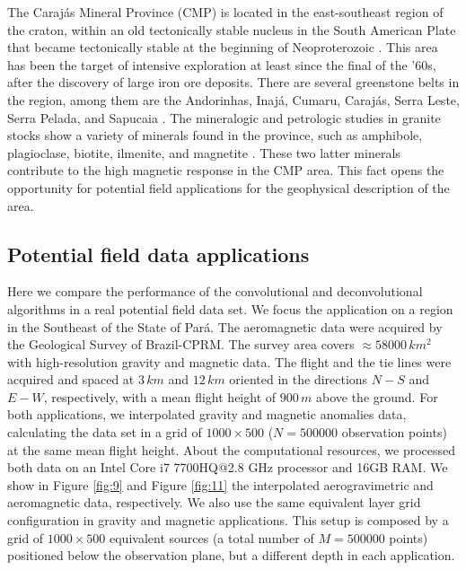 The Carajás Mineral Province (CMP) is located in the east-southeast region of the craton, within an old tectonically stable nucleus in the South American Plate that became tectonically stable at the beginning of Neoproterozoic \citep{salomao_etal_2019}. This area has been the target of intensive exploration at least since the final of the '60s, after the discovery of large iron ore deposits. There are several greenstone belts in the region, among them are the Andorinhas, Inajá, Cumaru, Carajás, Serra Leste, Serra Pelada, and Sapucaia \citep{santos_etal_2000}. The mineralogic and petrologic studies in granite stocks show a variety of minerals found in the province, such as amphibole, plagioclase, biotite, ilmenite, and magnetite \citep{cunha_etal_2016}. These two latter minerals contribute to the high magnetic response in the CMP area. This fact opens the opportunity for potential field applications for the geophysical description of the area. 

\subsection{Potential field data applications}

Here we compare the performance of the convolutional and deconvolutional algorithms in a real potential field data set. We focus the application on a region in the Southeast of the State of Pará. The aeromagnetic data were acquired by the Geological Survey of Brazil-CPRM. The survey area covers $\approx 58000 \, km^2$ with high-resolution gravity and magnetic data. The flight and the tie lines were acquired and spaced at $3 \, km$  and $12 \, km$ oriented in the directions $N-S$ and $E-W$, respectively, with a mean flight height of $900\, m$ above the ground. For both applications, we interpolated gravity and magnetic anomalies data, calculating the data set in a grid of $1000 \times 500$ ($N = 500000$ observation points) at the same mean flight height. About the computational resources, we processed both data on an Intel Core i7 7700HQ@2.8 GHz processor and 16GB RAM. We show in Figure \ref{fig:9} and Figure \ref{fig:11} the interpolated aerogravimetric and aeromagnetic data, respectively. We also use the same equivalent layer grid configuration in gravity and magnetic applications. This setup is composed by a grid of $1000 \times 500$ equivalent sources (a total number of $M = 500000$ points) positioned below the observation plane, but a different depth in each application.

